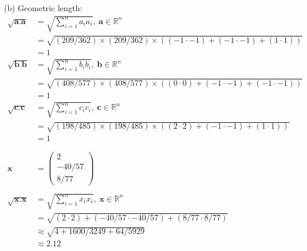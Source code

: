 \documentclass[12pt,letterpaper,fleqn]{article}
\theoremstyle{definition}
\begin{document}
(b) Geometric length:
\begin{equation*}
\begin{split}
\sqrt{\textbf{a.a}} &= \sqrt{\sum_{i=1}^{n} a_i a_i},~ \textbf{a} \in \mathbb{R}^n\\
 &= \sqrt{(209/362) \times (209/362) \times ((-1\cdot-1) + (-1\cdot-1) + (1\cdot1))}\\
&= 1\\
\sqrt{\textbf{b.b}} &= \sqrt{\sum_{i=1}^{n} b_i b_i},~ \textbf{b} \in \mathbb{R}^n\\
 &= \sqrt{(408/577) \times (408/577) \times ((0\cdot0) + (-1\cdot-1) + (-1\cdot-1))}\\
&= 1\\
\sqrt{\textbf{c.c}} &= \sqrt{\sum_{i=1}^{n} c_i c_i},~ \textbf{c} \in \mathbb{R}^n\\
 &= \sqrt{(198/485) \times (198/485) \times ((2\cdot2) + (-1\cdot-1) + (1\cdot1))}\\
&= 1\\
\\
\\
\textbf{x} &= \begin{pmatrix}
2\\
-40/57\\
8/77
\end{pmatrix}\\
\\
\sqrt{\textbf{x.x}} &= \sqrt{\sum_{i=1}^{n} x_i x_i},~ \textbf{x} \in \mathbb{R}^n\\
 &= \sqrt{(2\cdot2) + (-40/57 \cdot -40/57) + (8/77 \cdot 8/77)}\\
&\approx \sqrt{4 + 1600/3249 + 64/5929}\\
&\approx 2.12
\end{split}
\end{equation*}
\end{document}
